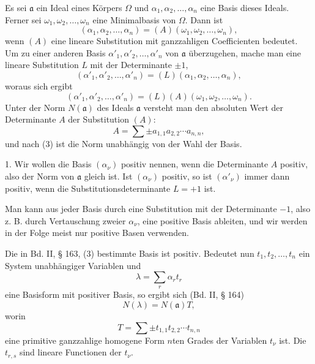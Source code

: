 \documentclass[11pt]{article}
\begin{document}
Es sei $\mathfrak a$ ein Ideal eines Körpers $\Omega$ und $\alpha_1,\alpha_2,
\ldots,\alpha_n$ eine Basis dieses Ideals. Ferner sei $\omega_1,\omega_2,
\ldots,\omega_n$ eine Minimalbasis von $\Omega$. Dann ist
\begin{equation}
 (\alpha_1,\alpha_2,\ldots,\alpha_n)=(A)(\omega_1,\omega_2,
\ldots,\omega_n),\tag{1}
\end{equation}
wenn $(A)$ eine lineare Substitution mit ganzzahligen Coefficienten bedeutet. Um zu einer anderen Basis $\alpha'_1,\alpha'_2,
\ldots,\alpha'_n$ von $\mathfrak a$ überzugehen, mache man eine lineare Substitution $L$ mit der Determinante $\pm 1$,
\begin{equation}
 (\alpha'_1,\alpha'_2,
\ldots,\alpha'_n)=(L)(\alpha_1,\alpha_2,
\ldots,\alpha_n),\tag{2}
\end{equation}
woraus sich ergibt
\begin{equation}
 (\alpha'_1,\alpha'_2,
\ldots,\alpha'_n)=(L)(A)(\omega_1,\omega_2,
\ldots,\omega_n).\tag{3}
\end{equation}
Unter der Norm $N(\mathfrak a)$ des Ideals $\mathfrak a$ versteht man den absoluten Wert der Determinante $A$ der Substitution $(A)$:
\[
 A=\sum \pm a_{1,1}a_{2,2}\cdots a_{n,n},
\]
und nach (3) ist die Norm unabhängig von der Wahl der Basis.

1. Wir wollen die Basis $(\alpha_\nu)$ positiv nennen, wenn die Determinante $A$ positiv, also der Norm von $\mathfrak a$ gleich ist. Ist $(\alpha_\nu)$ positiv, so ist $(\alpha'_\nu)$ immer dann positiv, wenn die Substitutionsdeterminante $L=+1$ ist.

Man kann aus jeder Basis durch eine Substitution mit der Determinante $-1$, also z. B. durch Vertauschung zweier $\alpha_\nu$, eine positive Basis ableiten, und wir werden in der Folge meist nur positive Basen verwenden.

Die in Bd. II, § 163, (3) bestimmte Basis ist positiv. Bedeutet nun $t_1,t_2,
\ldots,t_n$ ein System unabhängiger Variablen und
\begin{equation}
 \lambda=\sum_r \alpha_r t_r\tag{4}
\end{equation}
eine Basisform mit positiver Basis, so ergibt sich (Bd. II, § 164)
\begin{equation}
 N(\lambda)=N(\mathfrak a)T,\tag{5}
\end{equation}
worin
\begin{equation}
 T=\sum \pm t_{1,1}t_{2,2}\cdots t_{n,n}\tag{6}
\end{equation}
eine primitive ganzzahlige homogene Form $n$ten Grades der Variablen $t_\nu$ ist. Die $t_{r,s}$ sind lineare Functionen der $t_\nu$.
\end{document}
